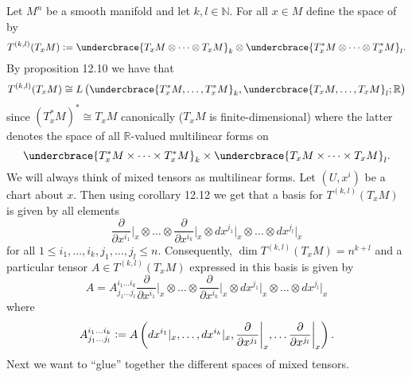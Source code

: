 Let $M^n$ be a smooth manifold and let $k,l \in \mathbb{N}$. For all $x \in M$ define the space of  by
\begin{equation*}
	T^{(k,l)}(T_xM) := \undercbrace{T_xM \otimes \dots \otimes T_xM}_{k} \otimes \undercbrace{T^*_xM \otimes \dots \otimes T^*_xM}_{l}.
\end{equation*}
By proposition 12.10 \cite[311]{lee:smooth_manifolds:2013} we have that 
\begin{equation*}
	T^{(k,l)}(T_xM) \cong L\del[1]{\undercbrace{T^*_xM, \dots, T^*_xM}_{k},\undercbrace{T_xM,\dots,T_xM}_{l};\mathbb{R}}
\end{equation*}
\noindent since $(T^*_xM)^* \cong T_xM$ canonically ($T_xM$ is finite-dimensional) where the latter denotes the space of all $\mathbb{R}$-valued multilinear forms on
\begin{equation*}
	\undercbrace{T^*_xM \times \dots \times T^*_xM}_{k} \times \undercbrace{T_xM \times \dots \times T_xM}_{l}.
\end{equation*}
We will always think of mixed tensors as multilinear forms. Let $(U,x^i)$ be a chart about $x$. Then using corollary 12.12 \cite[313]{lee:smooth_manifolds:2013} we get that a basis for $T^{(k,l)}(T_xM)$ is given by all elements 
\begin{equation*}
	\frac{\partial}{\partial x^{i_1}}\bigg\vert_x \otimes \dots \otimes \frac{\partial}{\partial x^{i_k}}\bigg\vert_x \otimes dx^{j_1}\vert_x \otimes \dots \otimes dx^{j_l}\vert_x
\end{equation*}
\noindent for all $1 \leq i_1,\dots,i_k,j_1,\dots,j_l \leq n$. Consequently, $\dim T^{(k,l)}(T_xM) = n^{k + l}$ and a particular tensor $A \in T^{(k,l)}(T_xM)$ expressed in this basis is given by 
\begin{equation}
	\label{eq:tensor_expression_basis}
	A = A^{i_1\dots i_k}_{j_1\dots j_l}\frac{\partial}{\partial x^{i_1}}\bigg\vert_x \otimes \dots \otimes \frac{\partial}{\partial x^{i_k}}\bigg\vert_x \otimes dx^{j_1}\vert_x \otimes \dots \otimes dx^{j_l}\vert_x
\end{equation}
\noindent where
\begin{equation}
	\label{eq:tensor_components}
	A^{i_1\dots i_k}_{j_1\dots j_l} := A\del[3]{dx^{i_1}\vert_x,\dots,dx^{i_k}\vert_x,\frac{\partial}{\partial x^{j_1}}\bigg\vert_x,\dots\frac{\partial}{\partial x^{j_l}}\bigg\vert_x}.
\end{equation}
Next we want to ``glue'' together the different spaces of mixed tensors. 

